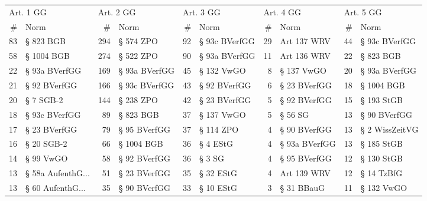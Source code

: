 \begin{tabular}{rlrlrlrlrl}
\toprule
\multicolumn{2}{l}{Art. 1 GG} & \multicolumn{2}{l}{Art. 2 GG} & \multicolumn{2}{l}{Art. 3 GG} & \multicolumn{2}{l}{Art. 4 GG} & \multicolumn{2}{l}{Art. 5 GG} \\
        \# &                Norm &         \# &               Norm &         \# &          Norm &         \# &           Norm &         \# &           Norm \\
\midrule
       83 &           § 823 BGB &       294 &          § 574 ZPO &        92 & § 93c BVerfGG &        29 &    Art 137 WRV &        44 &  § 93c BVerfGG \\
       58 &          § 1004 BGB &       274 &          § 522 ZPO &        90 & § 93a BVerfGG &        11 &    Art 136 WRV &        22 &      § 823 BGB \\
       22 &       § 93a BVerfGG &       169 &      § 93a BVerfGG &        45 &    § 132 VwGO &         8 &     § 137 VwGO &        20 &  § 93a BVerfGG \\
       21 &        § 92 BVerfGG &       166 &      § 93c BVerfGG &        43 &  § 92 BVerfGG &         6 &   § 23 BVerfGG &        18 &     § 1004 BGB \\
       20 &           § 7 SGB-2 &       144 &          § 238 ZPO &        42 &  § 23 BVerfGG &         5 &   § 92 BVerfGG &        15 &     § 193 StGB \\
       18 &       § 93c BVerfGG &        89 &          § 823 BGB &        37 &    § 137 VwGO &         5 &        § 56 SG &        13 &   § 90 BVerfGG \\
       17 &        § 23 BVerfGG &        79 &       § 95 BVerfGG &        37 &     § 114 ZPO &         4 &   § 90 BVerfGG &        13 & § 2 WissZeitVG \\
       16 &          § 20 SGB-2 &        66 &         § 1004 BGB &        36 &      § 4 EStG &         4 &  § 93a BVerfGG &        13 &     § 185 StGB \\
       14 &           § 99 VwGO &        58 &       § 92 BVerfGG &        36 &        § 3 SG &         4 &   § 95 BVerfGG &        12 &     § 130 StGB \\
       13 & § 58a AufenthG... &        51 &       § 23 BVerfGG &        35 &     § 32 EStG &         4 &    Art 139 WRV &        12 &     § 14 TzBfG \\
       13 &  § 60 AufenthG... &        35 &       § 90 BVerfGG &        33 &     § 10 EStG &         3 &     § 31 BBauG &        11 &     § 132 VwGO \\

\end{tabular}
